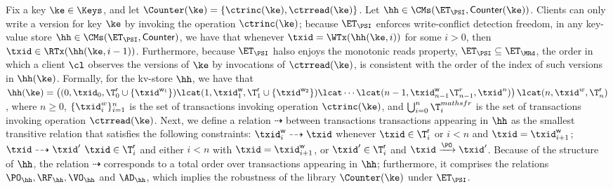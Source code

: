 Fix a key $\ke \in \Keys$, and let $\Counter(\ke) = \{\ctrinc(\ke), 
\ctrread(\ke)\}$. Let $\hh \in \CMs(\ET_{\PSI}, \mathsf{Counter}(\ke))$.
Clients can only write a version for key $\ke$ by invoking the 
operation $\ctrinc(\ke)$; because $\ET_{\PSI}$ 
enforces write-conflict detection freedom, in any key-value store 
$\hh \in \CMs(\ET_{\PSI}, \mathsf{Counter})$, we have that 
whenever $\txid = \WTx(\hh(\ke, i))$ for some $i > 0$, then 
$\txid \in \RTx(\hh(\ke, i-1))$. Furthermore, because 
$\ET_{\PSI}$ halso enjoys the monotonic reads property, 
$\ET_{\PSI} \subseteq \ET_{\MRd}$, the order in which 
a client $\cl$ observes the versions of $\ke$ by invocations of $\ctrread(\ke)$, 
is consistent with the order of the index of such versions in $\hh(\ke)$. 
Formally, for the kv-store $\hh$, we have that 
$\hh(\ke) = \left( (0, \txid_{0}, \T^{\mathsf{r}}_{0} \cup \{\txid^{\mathsf{w}_{1}}\}) 
\lcat (1, \txid^{\mathsf{w}}_{1}, \T^{\mathsf{r}}_{1} \cup \{\txid^{\mathsf{w}_{2}}\}) 
\lcat \cdots \lcat (n-1, \txid^{\mathsf{w}}_{n-1} \T^{r}_{n-1}, \txid^{n}) \right) \lcat 
(n, \txid^{w}, \T^{\mathsf{r}}_{n})$, where $n \geq 0$, $\{\txid^{w}_{i}\}_{i=1}^{n}$ is the 
set of transactions invoking operation $\ctrinc(\ke)$, and $\bigcup_{i=0}^{n} 
\T^{mathsf{r}}_{i}$ is the set of transactions invoking operation $\ctrread(\ke)$. 
Next, we define a relation $\dashrightarrow$ between transactions
transactions appearing in $\hh$ as the smallest transitive relation that 
satisfies the following constraints: $\txid^{\mathsf{w}}_{i} 
\dashrightarrow \txid$ whenever $\txid \in \T^{\mathsf{r}}_{i}$ 
or $i < n$ and $\txid = \txid^{\mathsf{w}}_{i+1}$; $\txid \dashrightarrow 
\txid'$ $\txid \in \T^{\mathsf{r}}_{i}$ and either $i < n$ with $\txid = \txid^{\mathsf{w}}_{i+1}$, 
or $\txid' \in \T^{\mathsf{r}}_{i}$ and $\txid \xrightarrow{\PO} \txid'$. 
Because of the structure of $\hh$, the relation $\dashrightarrow$ corresponds to a 
total order over transactions appearing in $\hh$; furthermore, it comprises 
the relations $\PO_{\hh}, \RF_{\hh}, \VO_{\hh}$ and $\AD_{\hh}$, which implies 
the robustness of the library $\Counter(\ke)$ under $\ET_{\PSI}$.


